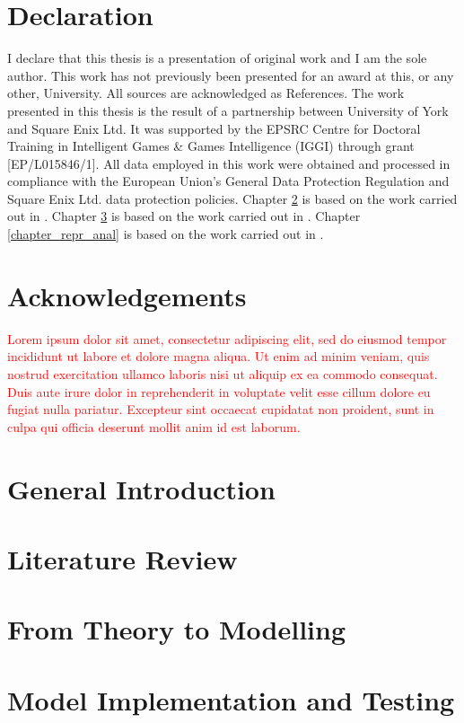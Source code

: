 \documentclass{yorkThesis}
\newcommand{\lorem}{\textcolor{red}{Lorem ipsum dolor sit amet, consectetur adipiscing elit, sed do eiusmod tempor incididunt ut labore et dolore magna aliqua. Ut enim ad minim veniam, quis nostrud exercitation ullamco laboris nisi ut aliquip ex ea commodo consequat. Duis aute irure dolor in reprehenderit in voluptate velit esse cillum dolore eu fugiat nulla pariatur. Excepteur sint occaecat cupidatat non proident, sunt in culpa qui officia deserunt mollit anim id est laborum.\\}}
\begin{document}
\chapter*{Declaration}
I declare that this thesis is a presentation of original work and I am the sole author. This work has not previously been presented for an award at this, or any other, University. All sources are acknowledged as References. The work presented in this thesis is the result of a partnership between University of York and Square Enix Ltd. It was supported by the EPSRC Centre for Doctoral Training in Intelligent Games \& Games Intelligence (IGGI) through grant [EP/L015846/1]. All data employed in this work were obtained and processed in compliance with the European Union's General Data Protection Regulation \cite{EUdataregulations2018} and Square Enix Ltd. data protection policies. Chapter \ref{chapter_theory_modelling} is based on the work carried out in \cite{bonometti2020theory, bonometti2021approximating}. Chapter \ref{chapter_implementation_testing} is based on the work carried out in \cite{bonometti2019modelling, bonometti2020theory, bonometti2021approximating}. Chapter \ref{chapter_repr_anal} is based on the work carried out in \cite{bonometti2021approximating}.

\chapter*{Acknowledgements}
\lorem

\chapter*{General Introduction}
\label{chapter_intro}


\tableofcontents


\chapter{Literature Review}
\label{chapter_lit_review}


\chapter{From Theory to Modelling}
\label{chapter_theory_modelling}


\chapter{Model Implementation and Testing}
\label{chapter_implementation_testing}

\end{document}
